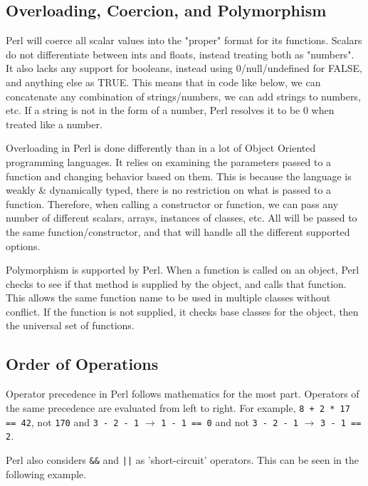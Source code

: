 \documentclass[12pt]{article}
\newcommand{\li}[1]{\lstinline{#1}} %
\begin{document}
	\subsection{Overloading, Coercion, and Polymorphism}
	
	Perl will coerce all scalar values into the "proper" format for its functions. Scalars do not differentiate between ints and floats, instead treating both as "numbers". It also lacks any support for booleans, instead using 0/null/undefined for FALSE, and anything else as TRUE. This means that in code like below, we can concatenate any combination of strings/numbers, we can add strings to numbers, etc. If a string is not in the form of a number, Perl resolves it to be 0 when treated like a number.
	
	
	
	Overloading in Perl is done differently than in a lot of Object Oriented programming languages. It relies on examining the parameters passed to a function and changing behavior based on them. This is because the language is weakly \& dynamically typed, there is no restriction on what is passed to a function. Therefore, when calling a constructor or function, we can pass any number of different scalars, arrays, instances of classes, etc. All will be passed to the same function/constructor, and that will handle all the different supported options\cite{ol}.
	
	Polymorphism is supported by Perl. When a function is called on an object, Perl checks to see if that method is supplied by the object, and calls that function. This allows the same function name to be used in multiple classes without conflict. If the function is not supplied, it checks base classes for the object, then the universal set of functions. 
	
	\subsection{Order of Operations}
	
	Operator precedence in Perl follows mathematics for the most part. Operators of the same precedence are evaluated from left to right. For example, \li{8 + 2 * 17 == 42}, not \li{170} and \li{3 - 2 - 1} $\rightarrow$ \li{1 - 1 == 0} and not \li{3 - 2 - 1} $\rightarrow$ \li{3 - 1 == 2}.
	
	Perl also considers \li{&&} and \li{||} as 'short-circuit' operators. This can be seen in the following example.
	
\end{document}
